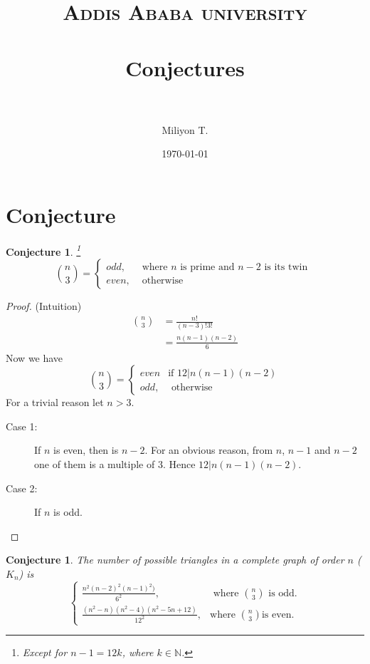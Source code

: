 \documentclass[paper=a4, fontsize=12pt]{scrartcl} %
\title{	
\normalfont \normalsize
\textsc{Addis Ababa university} \\ [25pt] %
\horrule{0.5pt} \\[0.4cm] %
\huge Conjectures \\ %
\horrule{2pt} \\[0.5cm] %
}
\author{Miliyon T.} %
\date{\normalsize\today} %
\newtheorem{conj}[thm]{Conjecture}
\theoremstyle{definition}
\theoremstyle{remark}
\begin{document}
\maketitle %
\section{Conjecture}

\begin{conj}\footnote{Except for $n-1=12k$, where $k\in \mathbb{N}$.}
$$
\binom{n}{3}=
\begin{cases}
odd,&\mbox{ where } n \mbox{ is prime and } n-2 \mbox{ is its twin }\\
even,&\mbox{ otherwise }
\end{cases}
$$
\end{conj}

\begin{proof}(Intuition)
\begin{align*}
\binom{n}{3}&=\frac{n!}{(n-3)!3!}\\
            &=\frac{n(n-1)(n-2)}{6}
\end{align*}
Now we have 
$$
\binom{n}{3}=
\begin{cases}
even &\mbox{if } 12|n(n-1)(n-2)\\
odd,&\mbox{ otherwise }
\end{cases}
$$
For a trivial reason let $n>3$.\\

\begin{description}
  \item[Case 1:] If $n$ is even, then is $n-2$. For an obvious reason, from $n$, $n-1$ and $n-2$ one of them is a multiple of 3. Hence $12|n(n-1)(n-2)$.
  \item[Case 2:] If $n$ is odd.
\end{description}
\end{proof}

\newpage
\begin{conj}\label{conj2}
The number of possible triangles in a complete graph of order $n$ ($K_n$) is 
$$
\begin{cases}
\frac{n^2(n-2)^2(n-1)^2)}{6^2},&\mbox{ where } \binom{n}{3} \mbox{ is odd.}\\
\frac{(n^2-n)(n^2-4)(n^2-5n+12)}{12^2} ,&\mbox{where }\binom{n}{3} \mbox{is even.}
\end{cases}
$$
\end{conj}
\end{document}
